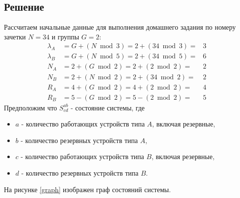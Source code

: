 \subsection{Решение}

Рассчитаем начальные данные для выполнения домашнего задания по номеру зачетки $N = 34$ и группы $G = 2$:
\[
\begin{matrix}
    \lambda_A & = G + (N \bmod 3) = 2 + (34 \bmod 3) = & 3 \\
    \lambda_B & = G + (N \bmod 5) = 2 + (34 \bmod 5) = & 6 \\
    N_A & = 2 + (G \bmod 2) = 2 + (2 \bmod 2) = & 2 \\
    N_B & = 2 + (N \bmod 2) = 2 + (34 \bmod 2) = & 2 \\
    R_A & = 4 + (G \bmod 2) = 4 + (2 \bmod 2) = & 4 \\
    R_B & = 5 - (G \bmod 2) = 5 - (2 \bmod 2) = & 5
\end{matrix}
\]
Предположим что $S^{ab}_{cd}$ - состояние системы, где
\begin{itemize}
    \item $a$ - количество работающих устройств типа $A$, включая резервные,
    \item $b$ - количество резервных устройств типа $A$,
    \item $c$ - количество работающих устройств типа $B$, включая резервные,
    \item $d$ - количество резервных устройств типа $B$.
\end{itemize}
На рисунке \ref{graph} изображен граф состояний системы.


